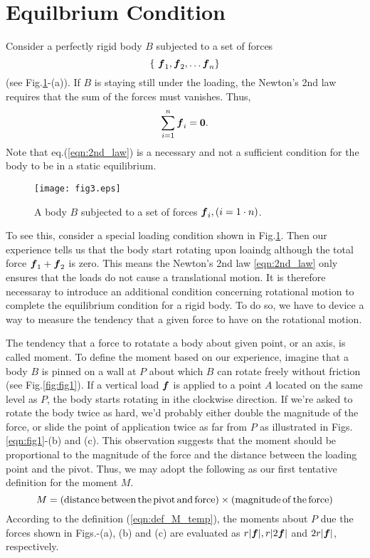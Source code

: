 \documentclass[10pt,a4j]{article}
\begin{document}
\section{Equilbrium Condition}
Consider a perfectly rigid body $B$ subjected to a set of forces
\[ 
	\left\{\ \fat{f}_1, \fat{f}_2, \dots \fat{f}_{n} \right\}
\]
(see Fig.\ref{fig:fig3}-(a)).
If $B$ is staying still under the loading, the Newton's 2nd law requires that 
the sum of the forces must vanishes. Thus,
\begin{equation}
	\sum_{i=1}^n \mbox{\boldmath $f$}_i = \mbox{\boldmath $0$}.
	\label{eqn:2nd_law}
\end{equation}
Note that eq.(\ref{eqn:2nd_law}) is a necessary and not a sufficient condition 
for the body to be in a static equilibrium. 
\begin{figure}[h]
	\begin{center}
	\texttt{[image: fig3.eps]} 
	\end{center}
	\caption{A body $B$ subjected to a set of forces $\mbox{\boldmath $f$}_i,(i=1\cdot n)$.} 
	\label{fig:fig3}
\end{figure}
To see this, consider a special loading condition shown in Fig.\ref{fig:fig3}. 
Then our experience tells us that the body start rotating upon loaindg although  
the total force $\mbox{\boldmath $f$}_1+\mbox{\boldmath $f$}_2$ is zero.
This means the Newton's 2nd law \ref{eqn:2nd_law} only ensures that the loads
do not cause a translational motion. 
It is therefore necessaray to introduce an additional condition concerning rotational 
motion to complete the equilibrium condition for a rigid body. 
To do so, we have to device a way to measure the tendency that a given force to have on 
the rotational motion. 

The tendency that a force to rotatate a body about given point, or an axis,
is called moment. To define the moment based on our experience, imagine that 
a body $B$ is pinned on a wall at $P$ about which $B$ can rotate freely without 
friction (see Fig.\ref{fig:fig1}). If a vertical load $\mbox{\boldmath $f$}$ is applied to a point $A$ 
located on the same level as $P$, the body starts rotating in ithe clockwise direction.
If we're asked to rotate the body twice as hard, we'd probably either 
double the magnitude of the force, or slide the point of application twice as far from $P$ 
as illustrated in Figs.\ref{eqn:fig1}-(b) and (c).
This observation suggests that the moment should be proportional to the magnitude of the 
force and the distance between the loading point and the pivot.  
Thus, we may adopt the following as our first tentative definition for the moment $M$. 
\begin{equation}
	M=({\rm distance \, between \,the \, pivot\, and\, force) \times (magnitude \, of \, the \,force)}
	\label{eqn:def_M_temp}
\end{equation}
According to the definition (\ref{eqn:def_M_temp}), the moments about $P$ due the 
forces shown in Figs.-(a), (b) and (c) are evaluated as $r|\mbox{\boldmath $f$}|, r|2\mbox{\boldmath $f$}|$ and $2r|\mbox{\boldmath $f$}|$, respectively.
\end{document}

